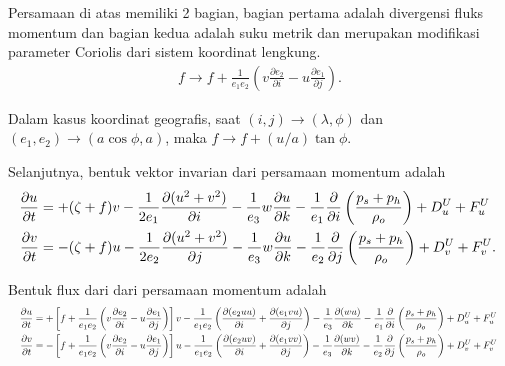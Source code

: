 \begin{spacing}{1.5}
	Persamaan di atas memiliki 2 bagian, bagian pertama adalah divergensi fluks momentum dan bagian kedua adalah suku metrik dan merupakan modifikasi parameter Coriolis dari sistem koordinat lengkung.
	\begin{equation*}
		\begin{aligned}
			f \rightarrow f +  \frac{1}{e_1e_2}\left(v\frac{\partial e_2}{\partial i}-u\frac{\partial e_1}{\partial j}\right).
		\end{aligned}
	\end{equation*}

	Dalam kasus koordinat geografis, saat $(i,j)\rightarrow(\lambda,\phi)$ dan $(e_1,e_2)\rightarrow(a\cos \phi, a)$, maka $f\rightarrow f+(u/a)\tan \phi$.
	
	Selanjutnya, bentuk vektor invarian dari persamaan momentum adalah
	\begin{equation}
		    \resizebox{\textwidth}{!}{%
			$
		\begin{aligned}
			\frac{\partial u}{\partial t} &= +(\zeta +f)v -  \frac{1}{2e_1}\frac{\partial (u^2+v^2)}{\partial i}-\frac{1}{e_3}w\frac{\partial u}{\partial k} - \frac{1}{e_1}\frac{\partial}{\partial i}\left(\frac{p_s+p_h}{\rho_o}\right)+D^U_u+F^U_u  \\
			\frac{\partial v}{\partial t} &= -(\zeta +f)u -  \frac{1}{2e_2}\frac{\partial (u^2+v^2)}{\partial j}-\frac{1}{e_3}w\frac{\partial u}{\partial k} - \frac{1}{e_2}\frac{\partial}{\partial j}\left(\frac{p_s+p_h}{\rho_o}\right)+D^U_v+F^U_v.%
		\end{aligned}
			$
		}
	\end{equation}

	Bentuk flux dari dari persamaan momentum adalah
		\begin{equation*}
		\resizebox{\textwidth}{!}{%
			$
			\begin{aligned}
				\frac{\partial u}{\partial t} &= +\left[f+\frac{1}{e_1e_2}\left(v\frac{\partial e_2}{\partial i} - u\frac{\partial e_1}{\partial j}\right) \right]v -  
				\frac{1}{e_1e_2}\left(\frac{\partial (e_2uu)}{\partial i} + \frac{\partial (e_1vu)}{\partial j}\right) -
				\frac{1}{e_3}\frac{\partial (wu)}{\partial k} - \frac{1}{e_1}\frac{\partial}{\partial i}\left(\frac{p_s+p_h}{\rho_o}\right)+D^U_u+F^U_u  \\
				\frac{\partial v}{\partial t} &= -\left[f+\frac{1}{e_1e_2}\left(v\frac{\partial e_2}{\partial i} - u\frac{\partial e_1}{\partial j}\right) \right]u -  
				\frac{1}{e_1e_2}\left(\frac{\partial (e_2uv)}{\partial i} + \frac{\partial (e_1vv)}{\partial j}\right) -
				\frac{1}{e_3}\frac{\partial (wv)}{\partial k} - \frac{1}{e_2}\frac{\partial}{\partial j}\left(\frac{p_s+p_h}{\rho_o}\right)+D^U_v+F^U_v%
			\end{aligned}
			$
		}
	\end{equation*}
	

\end{spacing}
